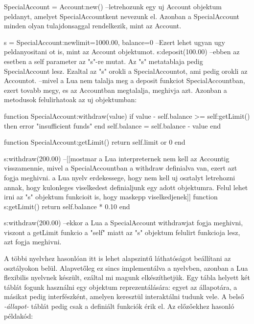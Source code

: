 \begin{lua}
SpecialAccount = Account:new() --letrehozunk egy uj Account objektum peldanyt, amelyet SpecialAccountkent nevezunk el. Azonban a SpecialAccount minden olyan tulajdonsaggal rendelkezik, mint az Account.

s = SpecialAccount:new{limit=1000.00, balance=0} --Ezert lehet ugyan ugy peldanyositani ot is, mint az Account objektumot.
s:deposit(100.00) --ebben az esetben a self parameter az "s"-re mutat. Az "s" metatablaja pedig SpecialAccount lesz. Ezaltal az "s" orokli a SpecialAccountot, ami pedig orokli az Accountot.
--mivel a Lua nem talalja meg a deposit funkciot SpecialAccountban, ezert tovabb megy, es az Accountban megtalalja, meghivja azt. Azonban a metodusok felulirhatoak az uj objektumban:

function SpecialAccount:withdraw(value)
  if value - self.balance >= self:getLimit() then
    error "insufficient funds"
  end
  self.balance = self.balance - value
end

function SpecialAccount:getLimit()
  return self.limit or 0
end

s:withdraw(200.00) --[[mostmar a Lua interpreternek nem kell az Accountig visszamennie, mivel a SpecialAccountban a withdraw definialva van, ezert azt fogja meghivni. 
a Lua nyelv erdekessege, hogy nem kell uj osztalyt letrehozni annak, hogy kulonleges viselkedest definialjunk egy adott objektumra. Felul lehet irni az "s" objektum funkcioit is, hogy maskepp viselkedjenek]]
function s:getLimit()
  return self.balance * 0.10
end

s:withdraw(200.00) --ekkor a Lua a SpecialAccount withdrawjat fogja meghivni, viszont a getLimit funkcio a "self" miatt az "s" objektum felulirt funkcioja lesz, azt fogja meghivni.
\end{lua}
\pagebreak
{}
A többi nyelvhez hasonlóan itt is lehet alapszintű láthatóságot beállítani az osztályokon belül. Alapvetőleg ez sincs implementálva a nyelvben, azonban a Lua flexibilis nyelvnek készült, ezáltal mi magunk elkészíthetjük. Egy tábla helyett két táblát fogunk használni egy objektum reprezentálására:
egyet az állapotára, a másikat pedig interfészként, amelyen keresztül interaktálni tudunk vele. A belső \textit{-állapot-} táblát pedig csak a definiált funkciók érik el. Az előzőekhez hasonló példakód:

